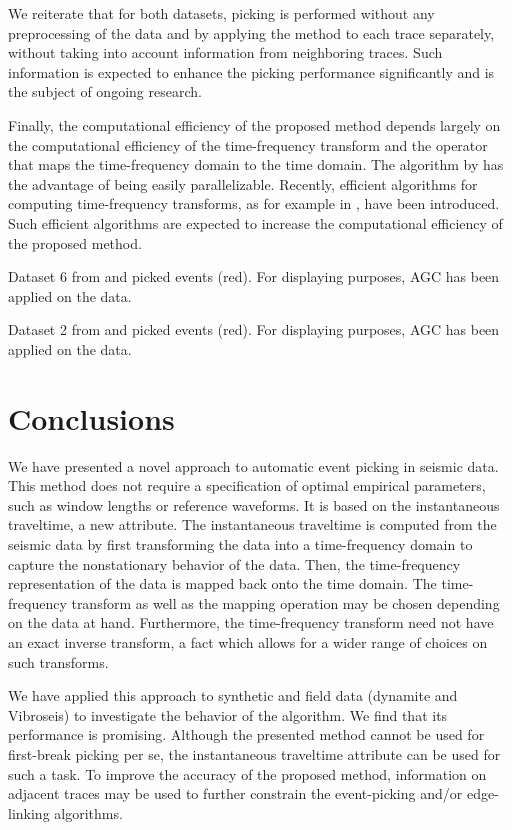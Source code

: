 We reiterate that for both datasets, picking is performed without any preprocessing of the data and by applying the method to each trace separately, without taking into account information from neighboring traces. Such information is expected to enhance the picking performance significantly and is the subject of ongoing research.

Finally, the computational efficiency of the proposed method depends largely on the computational efficiency of the time-frequency transform and the operator that maps the time-frequency domain to the time domain. The algorithm by \citet{liu11time-freq} has the advantage of being easily parallelizable. Recently, efficient algorithms for computing time-frequency transforms, as for example in \citep{brown10generalized}, have been introduced. Such efficient algorithms are expected to increase the computational efficiency of the proposed method.   

{Dataset 6 from \citep{yilmaz} and picked events (red). For displaying purposes, AGC has been applied on the data.}

{Dataset 2 from \citep{yilmaz} and picked events (red). For displaying purposes, AGC has been applied on the data.}\label{fig:oz2} 

\section{Conclusions}
We have presented a novel approach to automatic event picking in seismic data. This method does not require a specification of optimal empirical parameters, such as window lengths or reference waveforms. It is based on the instantaneous traveltime, a new attribute. The instantaneous traveltime is computed from the seismic data by first transforming the data into a time-frequency domain to capture the nonstationary behavior of the data. Then, the time-frequency representation of the data is mapped back onto the time domain. The time-frequency transform as well as the mapping operation may be chosen depending on the data at hand. Furthermore, the time-frequency transform need not have an exact inverse transform, a fact which allows for a wider range of choices on such transforms.

We have applied this approach to synthetic and field data (dynamite and Vibroseis) to investigate the behavior of the algorithm. We find that its performance is promising. Although the presented method cannot be used for first-break picking per se, the instantaneous traveltime attribute can be used for such a task. To improve the accuracy of the proposed method, information on adjacent traces may be used to further constrain the event-picking and/or edge-linking algorithms. 


